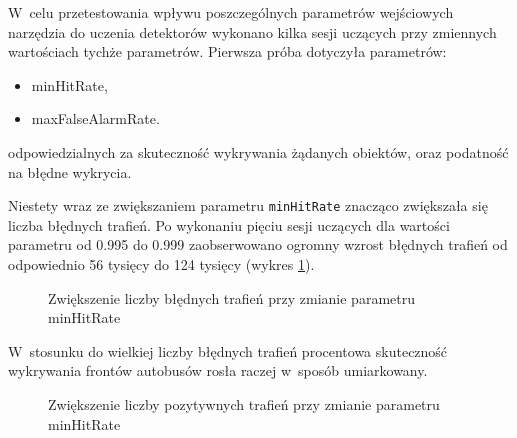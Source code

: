 W~celu przetestowania wpływu poszczególnych parametrów wejściowych
narzędzia do uczenia detektorów wykonano kilka sesji uczących 
przy zmiennych wartościach tychże parametrów. Pierwsza próba dotyczyła
parametrów:
\begin{itemize}
    \item minHitRate,
    \item maxFalseAlarmRate.
\end{itemize}
odpowiedzialnych za skuteczność wykrywania żądanych obiektów,
oraz podatność na błędne wykrycia.

Niestety wraz ze zwiększaniem parametru \verb|minHitRate|
znacząco zwiększała
się liczba błędnych trafień. Po wykonaniu pięciu sesji
uczących dla wartości parametru od 0.995 do 0.999 zaobserwowano 
ogromny wzrost błędnych trafień od odpowiednio 56 tysięcy
do 124 tysięcy (wykres \ref{chart:hitratio_fal}).

\begin{figure}[h!]
\begin{center}
\end{center}
\caption{Zwiększenie liczby błędnych trafień przy zmianie parametru minHitRate}
\label{chart:hitratio_fal}
\end{figure}

W~stosunku do wielkiej liczby błędnych trafień procentowa skuteczność
wykrywania frontów autobusów rosła raczej w~sposób umiarkowany.


\begin{figure}[h!]
\begin{center}
\end{center}
\caption{Zwiększenie liczby pozytywnych trafień przy zmianie parametru minHitRate}
\label{chart:hitratio_fro_sol}
\end{figure}

